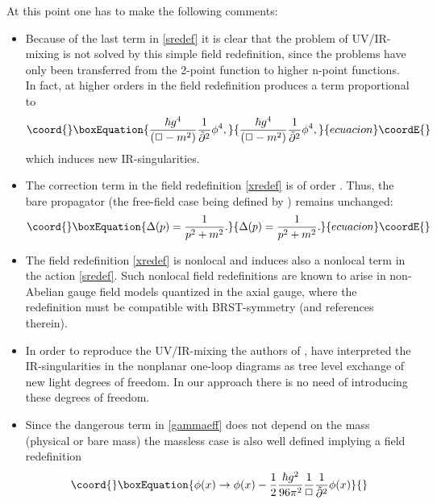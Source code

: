 \documentclass[a4paper,12pt]{article}
\begin{document}
At this point one has to make the following comments:
\begin{itemize}
\item Because of the last term in \eqref{sredef} it is clear that the problem of UV/IR-mixing is not solved by this simple field redefinition, since the problems have only been transferred from the 2-point function to higher n-point functions. In fact, at higher orders in \coordHE{} the field redefinition produces a term proportional to 
\begin{equation}\coord{}\boxEquation{
 \frac{\hbar g^4}{(\Box - m^2)} \frac{1}{\tilde{\partial}^2} \phi^4,
}{
 \frac{\hbar g^4}{(\Box - m^2)} \frac{1}{\tilde{\partial}^2} \phi^4,
}{ecuacion}\coordE{}\end{equation}
which induces new IR-singularities.
\item The correction term in the field redefinition \eqref{xredef} is of order \coordHE{}. Thus, the bare propagator (the free-field case being defined by \coordHE{}) remains unchanged:
  \begin{equation}\coord{}\boxEquation{
    \Delta(p) = \frac{1}{p^2 + m^2}.
  }{
    \Delta(p) = \frac{1}{p^2 + m^2}.
  }{ecuacion}\coordE{}\end{equation}
\item The field redefinition \eqref{xredef} is nonlocal and induces also a nonlocal term in the action \eqref{sredef}. Such nonlocal field redefinitions are known to arise in non-Abelian gauge field models quantized in the axial gauge, where the redefinition must be compatible with BRST-symmetry \cite{Boresch:1998} (and references therein).
\item In order to reproduce the UV/IR-mixing the authors of \cite{Minwalla:1999px}, \cite{VanRaamsdonk:2000rr} have interpreted the IR-singularities in the nonplanar one-loop diagrams as tree level exchange of new light degrees of freedom. In our approach there is no need of introducing these degrees of freedom.
\item Since the dangerous term \coordHE{} in \eqref{gammaeff} does not depend on the mass (physical or bare mass) the massless case is also well defined implying a field redefinition
  \begin{equation}\coord{}\boxEquation{
    \phi(x) \rightarrow  \phi(x) - \frac{1}{2} \frac{\hbar g^2}{96 \pi^2} 
      \frac{1}{\Box} \frac{1}{\tilde{\partial}^2} \phi(x)
  }{
}
\end{equation}
\end{itemize}
\end{document}
